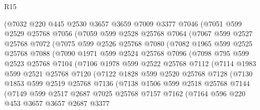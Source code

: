 \begin{lexlean}{R15}
\begin{coremodule}
      (@7032
        @220
        @445
        @2530
        @3657
        @3659
        @7009
        @3377
        @7046
        (@7051
          @599
          @2529
          @25768
          @7056
          (@7059
            @599
            @2528
            @25768
            @7064
            (@7067
              @599
              @2527
              @25768
              @7072
              (@7075
                @599
                @2526
                @25768
                @7080
                (@7082
                  @1965
                  @599
                  @2525
                  @25768
                  @7088
                  (@7090
                    @1971
                    @599
                    @2524
                    @25768
                    @7096
                    (@7098
                      @795
                      @599
                      @2523
                      @25768
                      @7104
                      (@7106
                        @1978
                        @599
                        @2522
                        @25768
                        @7112
                        (@7114
                          @1983
                          @599
                          @2521
                          @25768
                          @7120
                          (@7122
                            @1828
                            @599
                            @2520
                            @25768
                            @7128
                            (@7130
                              @1853
                              @599
                              @2519
                              @25768
                              @7136
                              (@7138
                                @1506
                                @599
                                @2518
                                @25768
                                @7144
                                (@7149
                                  @599
                                  @2517
                                  @2687
                                  @7025
                                  @25768
                                  @7157
                                  @7162
                                  (@7164
                                    @596
                                    @220
                                    @453
                                    @3657
                                    @3657
                                    @2687
                                    @3377

\end{coremodule}
\end{lexlean}
